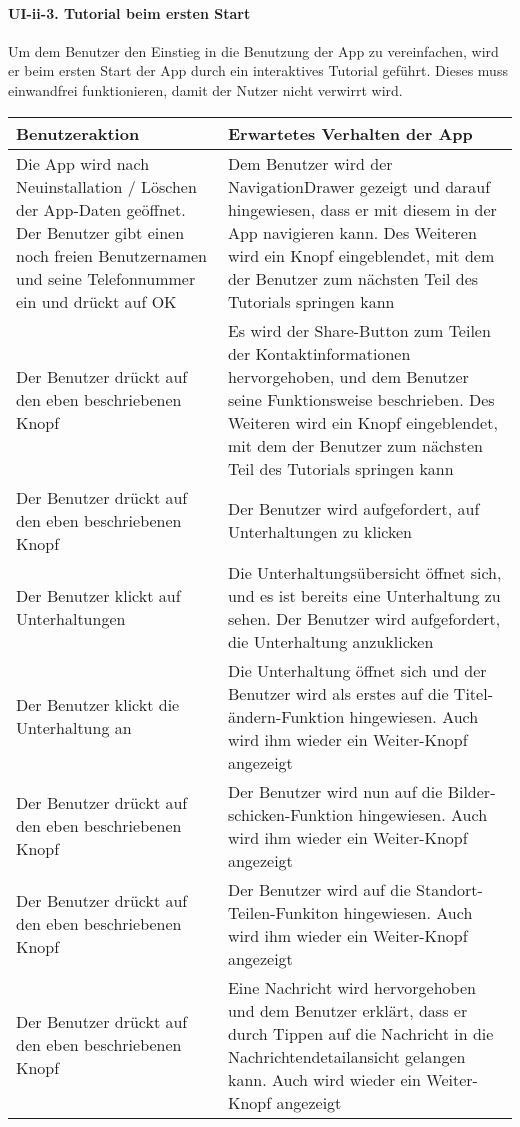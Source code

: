 \paragraph{UI-ii-3. Tutorial beim ersten
Start}\label{tutorial-beim-ersten-start}

Um dem Benutzer den Einstieg in die Benutzung der App zu vereinfachen,
wird er beim ersten Start der App durch ein interaktives Tutorial
geführt. Dieses muss einwandfrei funktionieren, damit der Nutzer nicht
verwirrt wird.

\begin{longtable}{|p{8cm}|p{8.5cm}|}
\hline
Benutzeraktion & Erwartetes Verhalten der App\tabularnewline
\hline

Die App wird nach Neuinstallation / Löschen der App-Daten geöffnet. Der
Benutzer gibt einen noch freien Benutzernamen und seine Telefonnummer
ein und drückt auf OK & Dem Benutzer wird der NavigationDrawer gezeigt
und darauf hingewiesen, dass er mit diesem in der App navigieren kann.
Des Weiteren wird ein Knopf eingeblendet, mit dem der Benutzer zum
nächsten Teil des Tutorials springen kann\tabularnewline
Der Benutzer drückt auf den eben beschriebenen Knopf & Es wird der
Share-Button zum Teilen der Kontaktinformationen hervorgehoben, und dem
Benutzer seine Funktionsweise beschrieben. Des Weiteren wird ein Knopf
eingeblendet, mit dem der Benutzer zum nächsten Teil des Tutorials
springen kann\tabularnewline
Der Benutzer drückt auf den eben beschriebenen Knopf & Der Benutzer wird
aufgefordert, auf Unterhaltungen zu klicken\tabularnewline
Der Benutzer klickt auf Unterhaltungen & Die Unterhaltungsübersicht
öffnet sich, und es ist bereits eine Unterhaltung zu sehen. Der Benutzer
wird aufgefordert, die Unterhaltung anzuklicken\tabularnewline
Der Benutzer klickt die Unterhaltung an & Die Unterhaltung öffnet sich
und der Benutzer wird als erstes auf die Titel-ändern-Funktion
hingewiesen. Auch wird ihm wieder ein Weiter-Knopf
angezeigt\tabularnewline
Der Benutzer drückt auf den eben beschriebenen Knopf & Der Benutzer wird
nun auf die Bilder-schicken-Funktion hingewiesen. Auch wird ihm wieder
ein Weiter-Knopf angezeigt\tabularnewline
Der Benutzer drückt auf den eben beschriebenen Knopf & Der Benutzer wird
auf die Standort-Teilen-Funkiton hingewiesen. Auch wird ihm wieder ein
Weiter-Knopf angezeigt\tabularnewline
Der Benutzer drückt auf den eben beschriebenen Knopf & Eine Nachricht
wird hervorgehoben und dem Benutzer erklärt, dass er durch Tippen auf
die Nachricht in die Nachrichtendetailansicht gelangen kann. Auch wird
wieder ein Weiter-Knopf angezeigt\tabularnewline

\end{longtable}
